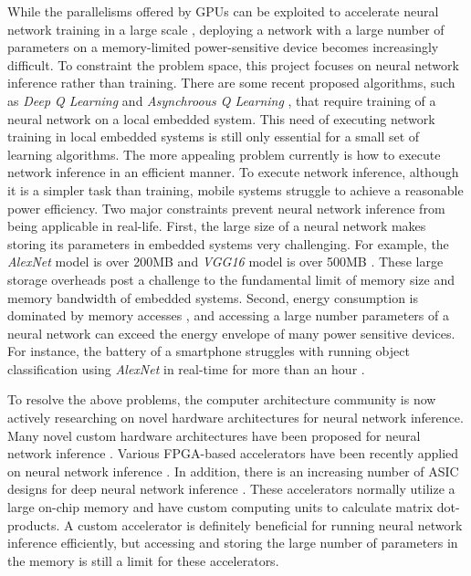 \documentclass[a4paper,12pt]{report}
\begin{document}
While the parallelisms
offered by GPUs can be exploited to accelerate neural network training in a large scale
, deploying a network with
a large number of parameters on a memory-limited power-sensitive device becomes
increasingly difficult.
To constraint the problem space, this project focuses on
neural network inference rather than training.
There are some recent proposed algorithms, such as \textit{Deep Q Learning} \cite{Mnih}
and \textit{Asynchroous Q Learning} \cite{Mnih2016}, that require training of a
neural network on a local embedded system.
This need of executing network training in local embedded systems is still only
essential for a small set of learning algorithms.
The more appealing problem currently is how to execute network inference in
an efficient manner.
To execute network inference, although it is a simpler task than training,
mobile systems struggle to achieve a reasonable power efficiency.
Two major constraints prevent neural network inference from being applicable in real-life.
First, the large size of a neural network makes storing its parameters in embedded systems
very challenging.
For example, the \textit{AlexNet} model is over 200MB and \textit{VGG16} model is over 500MB \cite{Han15, DBLP:journals/corr/SimonyanZ14a}.
These large storage overheads post a challenge to the fundamental limit of memory size and
memory bandwidth of embedded systems.
Second, energy consumption is dominated by memory accesses \cite{Tien}, and accessing
a large number parameters of a neural network can exceed the energy envelope of
many power sensitive devices.
For instance, the battery of a smartphone struggles with running object classification using \textit{AlexNet}
in real-time for more than an hour \cite{Tien}.

To resolve the above problems, the computer architecture community is now actively
researching on novel hardware architectures for neural network inference.
Many novel custom hardware architectures
have been proposed for neural network inference \cite{chen2014dadiannao,chen2014diannao,han2016eie,han2016ese}.
Various FPGA-based accelerators have been recently applied on neural network
inference \cite{zhang2015optimizing, Nurvitadhi:2017:FBG:3020078.3021740}.
In addition, there is an increasing number of ASIC designs for deep neural
network inference \cite{han2016eie, chen2017eyeriss}.
These accelerators normally utilize a large on-chip memory and have custom computing
units to calculate matrix dot-products.
A custom accelerator is definitely beneficial for running neural network inference
efficiently, but accessing and storing the large number of parameters in the memory
is still a limit for these accelerators.
\end{document}
